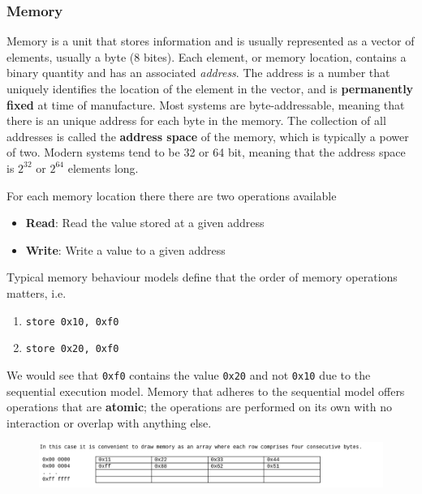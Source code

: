 \documentclass[10pt]{article}
\begin{document}

\subsubsection{Memory}
Memory is a unit that stores information and is usually represented as a vector of elements, usually a byte (8 bites).
Each element, or memory location, contains a binary quantity and has an associated \textit{address}.
The address is a number that uniquely identifies the location of the element in the vector, and is \textbf{permanently fixed} at time of manufacture.
Most systems are byte-addressable, meaning that there is an unique address for each byte in the memory.
The collection of all addresses is called the \textbf{address space} of the memory, which is typically a power of two.
Modern systems tend to be 32 or 64 bit, meaning that the address space is $ 2^{32} $ or $ 2^{64} $ elements long.

For each memory location there there are two operations available
\begin{itemize}
	\item \textbf{Read}: Read the value stored at a given address
	\item \textbf{Write}: Write a value to a given address
\end{itemize}


Typical memory behaviour models define that the order of memory operations matters, i.e. 

\begin{enumerate}
	\item \texttt{store 0x10, 0xf0} 
	\item \texttt{store 0x20, 0xf0} 
\end{enumerate}

We would see that \texttt{0xf0} contains the value \texttt{0x20} and not \texttt{0x10} due to the sequential execution model.
Memory that adheres to the sequential model offers operations that are \textbf{atomic}; the operations are performed on its own with no interaction or overlap with anything else.



\begin{figure}[H]
	\centering
	\includegraphics[width=\linewidth]{img/image_2022-09-16-02-10-27.png}
\end{figure}
\end{document}
